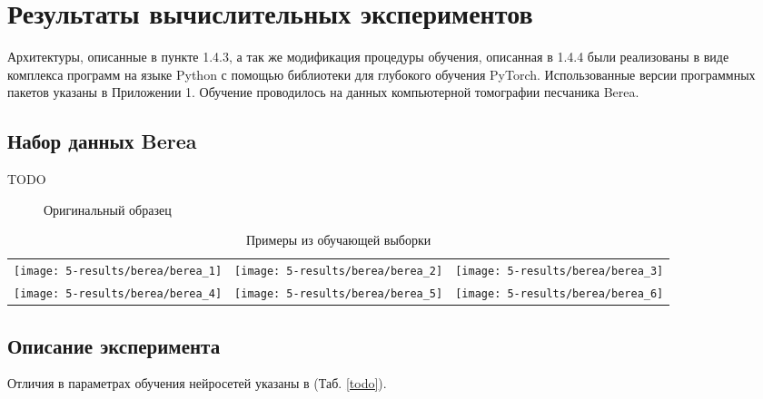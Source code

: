 \clearpage
\section{Результаты вычислительных экспериментов}
	Архитектуры, описанные в пункте 1.4.3, а так же модификация процедуры обучения, описанная в 1.4.4 были реализованы в виде комплекса программ на языке Python с помощью библиотеки для глубокого обучения PyTorch. Использованные версии программных пакетов указаны в Приложении 1. Обучение проводилось на данных компьютерной томографии песчаника Berea.
	\subsection{Набор данных Berea}
		TODO
		
		\begin{figure}[h!]
			\caption{Оригинальный образец}
			\label{5}
		\end{figure}
	
	
		\begin{table}[h!]
			\begin{center}
				\begin{tabular}{p{5cm} p{5cm} p{5cm}}
					\toprule
					\texttt{[image: 5-results/berea/berea\_1]}
					&
					\texttt{[image: 5-results/berea/berea\_2]}
					&
					\texttt{[image: 5-results/berea/berea\_3]}
					\\
					\texttt{[image: 5-results/berea/berea\_4]}
					&
					\texttt{[image: 5-results/berea/berea\_5]}
					&
					\texttt{[image: 5-results/berea/berea\_6]}
					\\
					\hline
				\end{tabular}
				\caption{Примеры из обучающей выборки}
				\label{5-berea64}
			\end{center}
		\end{table}
	\subsection{Описание эксперимента}
		Отличия в параметрах обучения нейросетей указаны в (Таб. \ref{todo}).
		
